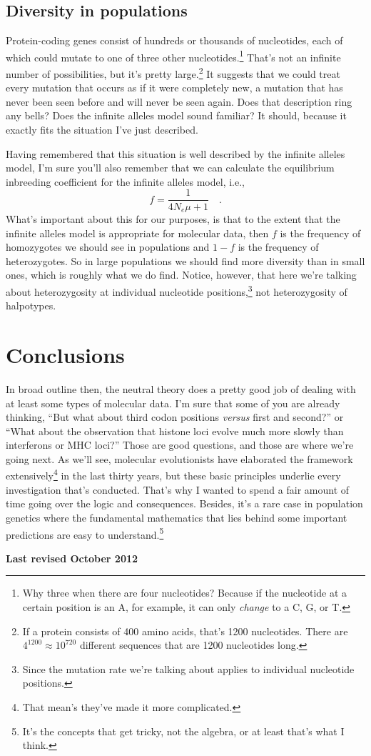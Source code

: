 \subsection*{Diversity in populations}

Protein-coding genes consist of hundreds or thousands of nucleotides,
each of which could mutate to one of three other
nucleotides.\footnote{Why three when there are four nucleotides?
  Because if the nucleotide at a certain position is an A, for
  example, it can only {\it change\/} to a C, G, or T.} That's not an
infinite number of possibilities, but it's pretty large.\footnote{If a
  protein consists of 400 amino acids, that's 1200 nucleotides. There
  are $4^{1200} \approx 10^{720}$ different sequences that are 1200
  nucleotides long.} It suggests that we could treat every mutation
that occurs as if it were completely new, a mutation that has never
been seen before and will never be seen again. Does that description
ring any bells? Does the infinite alleles model sound familiar? It
should, because it exactly fits the situation I've just
described.

Having remembered that this situation is well described by the
infinite alleles model, I'm sure you'll also remember that we can
calculate the equilibrium inbreeding coefficient for the infinite
alleles model, i.e.,
\[
f = \frac{1}{4N_e\mu + 1} \quad .
\]
What's important about this for our purposes, is that to the extent
that the infinite alleles model is appropriate for molecular data,
then $f$ is the frequency of homozygotes we should see in populations
and $1-f$ is the frequency of heterozygotes. So in large populations
we should find more diversity than in small ones, which is roughly
what we do find. Notice, however, that here we're talking about
heterozygosity at individual nucleotide positions,\footnote{Since the
  mutation rate we're talking about applies to individual nucleotide
  positions.} not heterozygosity of halpotypes.

\section*{Conclusions}

In broad outline then, the neutral theory does a pretty good job of
dealing with at least some types of molecular data. I'm sure that some
of you are already thinking, ``But what about third codon positions
{\it versus\/} first and second?'' or ``What about the observation
that histone loci evolve much more slowly than interferons or MHC
loci?''  Those are good questions, and those are where we're going
next. As we'll see, molecular evolutionists have elaborated the
framework extensively\footnote{That mean's they've made it more
  complicated.} in the last thirty years, but these basic principles
underlie every investigation that's conducted. That's why I wanted to
spend a fair amount of time going over the logic and
consequences. Besides, it's a rare case in population genetics where
the fundamental mathematics that lies behind some important
predictions are easy to understand.\footnote{It's the concepts that
  get tricky, not the algebra, or at least that's what I think.}

{\bf Last revised October 2012}